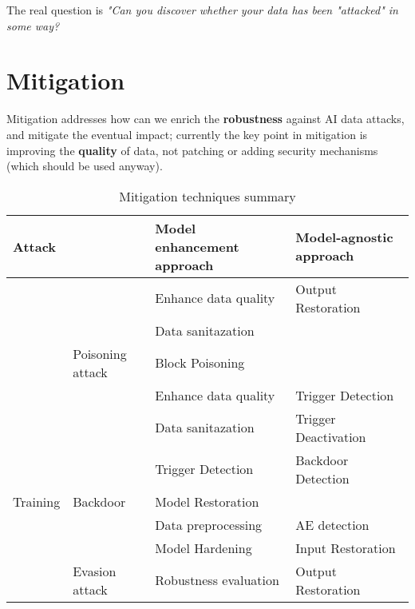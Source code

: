 \begin{center}
   The real question is \emph{"Can you discover whether your data has been \emph{"attacked"} in some way?}
\end{center}
\newpage   
\section{Mitigation}
Mitigation addresses how can we enrich the \textbf{robustness} against AI data attacks, and mitigate the eventual impact;
currently the key point in mitigation is improving the \textbf{quality} of data, not patching or adding security mechanisms (which should be used anyway).

\begin{table}[]
   \centering
   \caption{Mitigation techniques summary}
   \label{tab:mitigation_summary}
   \begin{tabular}{@{}llll@{}}
   \toprule
   \multicolumn{2}{|l|}{Attack}                                                                                                      & \multicolumn{1}{l|}{Model enhancement approach} & \multicolumn{1}{l|}{Model-agnostic approach}        \\ \midrule
   \multicolumn{1}{c}{}                           & & {Enhance data quality}     & {Output Restoration}           \\
   \multicolumn{1}{c}{}                           & & {Data sanitazation}        & \\
   \multicolumn{1}{c}{}                           & \multirow{-3}{*}{{Poisoning attack}} & {Block Poisoning}          & \\ \cmidrule(l){2-4} 
   \multicolumn{1}{c}{}                           & & {Enhance data quality}     & {Trigger Detection}            \\
   \multicolumn{1}{c}{}                           & & {Data sanitazation}        & {Trigger Deactivation}         \\
   \multicolumn{1}{c}{}                           & & {Trigger Detection}        & {Backdoor Detection}           \\
   \multicolumn{1}{c}{\multirow{-7}{*}{{Training}}} & \multirow{-4}{*}{{Backdoor}}         & {Model Restoration}        & \\ \midrule
   & & {Data preprocessing}       & {AE detection}                 \\
   & & {Model Hardening}          & {Input Restoration}            \\
   & \multirow{-3}{*}{{Evasion attack}}   & {Robustness evaluation}    & {Output Restoration}           \\ \cmidrule(l){2-4} 

\end{tabular}
\end{table}
